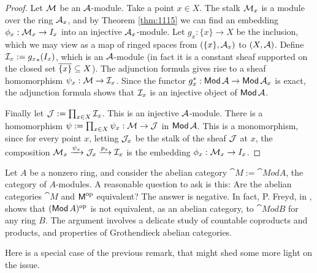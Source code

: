 \begin{proof}
Let $\mathcal{M}$ be an $\mathcal{A}$-module. Take a point $x \in X$. The stalk 
$\mathcal{M}_x$ is a module over the ring $\mathcal{A}_x$, and by Theorem 
\ref{thm:1115} we can
find an embedding $\phi_x : \mathcal{M}_x \to I_x$ into an injective
$\mathcal{A}_x$-module. 
Let $g_x : \{ x \} \to X$ be the inclusion, which we may view as a map of
ringed spaces from $( \{ x \}, \mathcal{A}_x)$ to $(X, \mathcal{A})$.
Define $\mathcal{I}_x := {g_x}_* (I_x)$, which is an $\mathcal{A}$-module (in fact it 
is a constant sheaf supported on the closed set $\overline{  \{ x \} } \subseteq X$). 
The adjunction formula gives rise to a sheaf homomorphism 
$\psi_x : \mathcal{M} \to  \mathcal{I}_x$. 
Since the functor $g_x^* : \operatorname{\mathsf{Mod}} \mathcal{A} \to \operatorname{\mathsf{Mod}} \mathcal{A}_x$
is exact, the adjunction formula shows that $\mathcal{I}_x$ is an injective
object of $\operatorname{\mathsf{Mod}} \mathcal{A}$.

Finally let $\mathcal{J} := \prod_{x \in X} \mathcal{I}_x$. This is an injective
$\mathcal{A}$-module. There is a homomorphism 
$\psi :=  \prod_{x \in X} \psi_x : \mathcal{M} \to \mathcal{J}$
in $\operatorname{\mathsf{Mod}} \mathcal{A}$. This is a monomorphism, since for every point $x$, 
letting $\mathcal{J}_x$ be the stalk of the sheaf $\mathcal{J}$ at $x$, the 
composition $\mathcal{M}_x \xrightarrow{\psi_x} \mathcal{J}_x \xrightarrow{p_x} \mathcal{I}_x$
is the embedding $\phi_x : \mathcal{M}_x \to I_x$.
\end{proof}

\begin{rem} \label{rem:2510}
Let $A$ be a nonzero ring, and consider the abelian category 
$\cat{M} := \cat{Mod} A$, the category of $A$-modules. A reasonable question to 
ask is this: Are the abelian categories $\cat{M}$ and $\operatorname{\mathsf{M}}^{\mathrm{op}}$ 
equivalent? The answer is negative. 
In fact, P. Freyd, in \cite[Exercise 5.B.3]{Fre}, shows that 
$(\operatorname{\mathsf{Mod}} A)^{\mathrm{op}}$ is not equivalent, as an abelian category, to 
$\cat{Mod} B$ for any ring $B$. The argument involves a delicate study of 
countable coproducts and products, and properties of Grothendieck abelian 
categories.  
\end{rem}

Here is a special case of the previous remark, that might shed some more light 
on the issue. 


